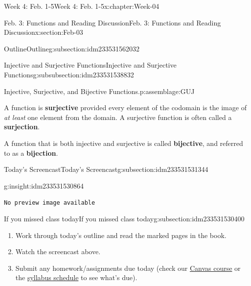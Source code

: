 \documentclass[oneside,10pt,]{book}
\newcommand{\mono}[1]{\texttt{#1}}
\newcommand{\terminology}[1]{\textbf{#1}}
\numberwithin{equation}{section}
\newlength{\qrsize}
\newlength{\previewwidth}
\begin{document}
\begin{chapterptx}{Week 4: Feb. 1-5}{}{Week 4: Feb. 1-5}{}{}{x:chapter:Week-04}
\begin{sectionptx}{Feb. 3: Functions and Reading Discussion}{}{Feb. 3: Functions and Reading Discussion}{}{}{x:section:Feb-03}
\begin{subsectionptx}{Outline}{}{Outline}{}{}{g:subsection:idm233531562032}
\begin{subsubsectionptx}{Injective and Surjective Functions}{}{Injective and Surjective Functions}{}{}{g:subsubsection:idm233531538832}
\begin{assemblage}{Injective, Surjective, and Bijective Functions.}{p:assemblage:GUJ}
\par
A function is \terminology{surjective} provided every element of the codomain is the image of \emph{at least} one element from the domain. A surjective function is often called a \terminology{surjection}.%
\par
A function that is both injective and surjective is called \terminology{bijective}, and referred to as a \terminology{bijection}.%
\end{assemblage}
\end{subsubsectionptx}
\end{subsectionptx}
%
%
\typeout{************************************************}
\typeout{************************************************}
%
\begin{subsectionptx}{Today's Screencast}{}{Today's Screencast}{}{}{g:subsection:idm233531531344}
\begin{insight}{}{g:insight:idm233531530864}%
\setlength{\qrsize}{9em}
\setlength{\previewwidth}{\linewidth}
\addtolength{\previewwidth}{-\qrsize}
\begin{tcbraster}[raster columns=2, raster column skip=1pt, raster halign=center, raster force size=false, raster left skip=0pt, raster right skip=0pt]%
\begin{tcolorbox}[previewstyle, width=\previewwidth]%
\mono{No preview image available}%
\end{tcolorbox}%
\begin{tcolorbox}[qrstyle]%
[QR LINK]\end{tcolorbox}%
\end{tcbraster}%
\end{insight}
\end{subsectionptx}
%
%
\typeout{************************************************}
\typeout{************************************************}
%
\begin{subsectionptx}{If you missed class today}{}{If you missed class today}{}{}{g:subsection:idm233531530400}
%
\begin{enumerate}
\item{}Work through today's outline and read the marked pages in the book.%
\item{}Watch the screencast above.%
\item{}Submit any homework\slash{}assignments due today (check our \href{https://dordt.instructure.com/courses/3110050}{Canvas course} or the \href{https://prof.mkjanssen.org/ds/index.html\#schedule}{syllabus schedule} to see what's due).%

\end{enumerate}
\end{subsectionptx}
\end{sectionptx}
\end{chapterptx}
\end{document}
